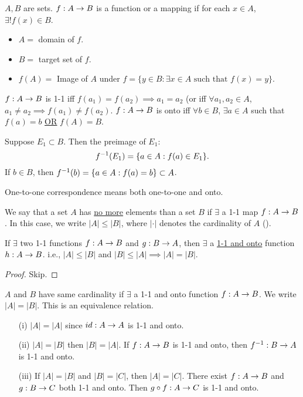 \documentclass[]{article}
\begin{document}
\begin{definition}
	[Function] $A,B$ are sets. $f:A\rightarrow B$ is a function or a mapping if for each $x\in A$, $\exists!f(x)\in B$.
	\begin{itemize}
		\item $A = $ domain of $f$.
		\item $B = $ target set of $f$.
		\item $f(A) = $ Image of $A$ under $f = \{y\in B: \exists x\in A \text{ such that } f(x)=y \}$.
	\end{itemize}
\end{definition}
\begin{definition}
	 $f:A\rightarrow B$ is 1-1 iff $f(a_1) = f(a_2) \implies a_1=a_2$ (or iff $\forall a_1,a_2\in A$, $a_1\neq a_2 \implies f(a_1)\neq f(a_2)$.
	$f:A\rightarrow B$ is onto iff $\forall b\in B$, $\exists a\in A$ such that $f(a)=b$ \ul{\ul{OR}} $f(A)=B$.
\end{definition}
\begin{definition}
	 Suppose $E_1\subset B$. Then the preimage of $E_1$: $$f^{-1}(E_1) = \{a\in A: f(a)\in E_1\}.$$
	If $b\in B$, then $f^{-1}(b) = \{a\in A : f(a)=b\} \subset A$.
\end{definition}
\begin{remark}
	One-to-one correspondence means both one-to-one and onto.
\end{remark}

\begin{definition}
	[Cardinality] We say that a set $A$ has \ul{no more} elements than a set $B$ if $\exists$ a 1-1 map $f:A\rightarrow B$.
	In this case, we write $|A|\leq |B|$, where $|\cdot|$ denotes the cardinality of $A$ ().
\end{definition}

\begin{theorem}
	If $\exists$ two 1-1 functions $f:A\rightarrow B$ and $g:B\rightarrow A$, then $\exists$ a \ul{1-1 and onto} function $h:A\rightarrow B$.
	i.e., $|A|\leq |B|$ and $|B|\leq |A| \implies |A|=|B|$.
\end{theorem}
\begin{proof}
	Skip.
\end{proof}
\begin{definition}
	$A$ and $B$ have same cardinality if $\exists$ a 1-1 and onto function $f:A\rightarrow B$. We write $|A| = |B|$. This is an equivalence relation.
	\begin{enumerate}
		\item[(i)] $|A| = |A|$ since $id:A\rightarrow A$ is 1-1 and onto.
		\item[(ii)] $|A|=|B|$ then $|B|=|A|$. If $f:A\rightarrow B$ is 1-1 and onto, then $f^{-1}:B\rightarrow A$ is 1-1 and onto.
		\item[(iii)] If $|A|=|B|$ and $|B|=|C|$, then $|A|=|C|$. There exist $f:A\rightarrow B$ and $g:B\rightarrow C$ both 1-1 and onto. Then $g\circ f: A\rightarrow C$ is 1-1 and onto.
	\end{enumerate}
\end{definition}
\end{document}
